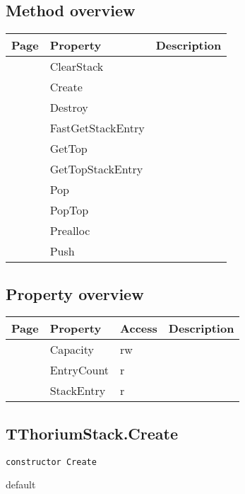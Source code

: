\subsection{Method overview}
\label{thoriumcore:thorium:tthoriumstack:methods}
\begin{tabularx}{\textwidth}{llX}
Page & Property & Description  \\ \hline
\pageref{thoriumcore:thorium:tthoriumstack:clearstack} & ClearStack  &  \\
\pageref{thoriumcore:thorium:tthoriumstack:create} & Create  &  \\
\pageref{thoriumcore:thorium:tthoriumstack:destroy} & Destroy  &  \\
\pageref{thoriumcore:thorium:tthoriumstack:fastgetstackentry} & FastGetStackEntry  &  \\
\pageref{thoriumcore:thorium:tthoriumstack:gettop} & GetTop  &  \\
\pageref{thoriumcore:thorium:tthoriumstack:gettopstackentry} & GetTopStackEntry  &  \\
\pageref{thoriumcore:thorium:tthoriumstack:pop} & Pop  &  \\
\pageref{thoriumcore:thorium:tthoriumstack:poptop} & PopTop  &  \\
\pageref{thoriumcore:thorium:tthoriumstack:prealloc} & Prealloc  &  \\
\pageref{thoriumcore:thorium:tthoriumstack:push} & Push  &  \\
\hline
\end{tabularx}
\subsection{Property overview}
\label{thoriumcore:thorium:tthoriumstack:properties}
\begin{tabularx}{\textwidth}{lllX}
Page & Property & Access & Description \\ \hline
\pageref{thoriumcore:thorium:tthoriumstack:capacity} & Capacity & rw &  \\
\pageref{thoriumcore:thorium:tthoriumstack:entrycount} & EntryCount & r &  \\
\pageref{thoriumcore:thorium:tthoriumstack:stackentry} & StackEntry & r &  \\
\hline
\end{tabularx}
\subsection{TThoriumStack.Create}
\label{thoriumcore:thorium:tthoriumstack:create}
\begin{FPCList}
\Synopsis
\Declaration 

\begin{verbatim}
constructor Create
\end{verbatim}
\Visibility
default
\Description
\Errors
\end{FPCList}
